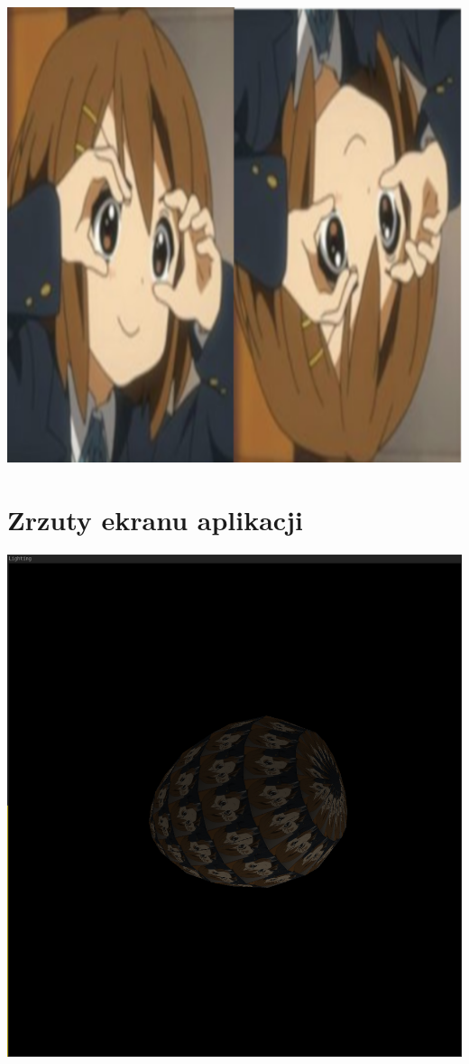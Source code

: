 \documentclass[polish,polish,a4paper]{report}
\begin{document}
\begin{center}
\includegraphics[scale=2]{yui}
\end{center}

\pagebreak
\section{Zrzuty ekranu aplikacji}

\begin{center}
\includegraphics[scale=2]{yuiegg1.png}
\end{center}
\end{document}

